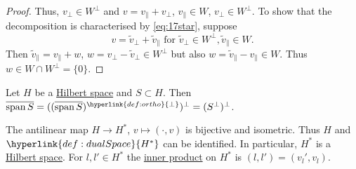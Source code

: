 \documentclass{article}
\DeclareMathOperator{\spn}{span}
\begin{document}
\begin{proof}
    Thus, $v_\perp \in W^\perp$ and $v = v_\parallel + v_\perp$, $v_\parallel \in W$, $v_\perp \in W^\perp$.
    To show that the decomposition is characterised by \eqref{eq:17star}, suppose
    \begin{equation*}
        v = \tilde{v}_\perp + \tilde{v}_\parallel \text{ for } \tilde{v}_\perp \in W^\perp, \tilde{v}_\parallel \in W.
    \end{equation*}
    Then $\tilde{v}_\parallel = v_\parallel + w$, $w = v_\perp - \tilde{v}_\perp \in W^\perp$ but also $w = \tilde{v}_\parallel - v_\parallel \in W$. Thus $w \in W \cap W^\perp = \{0\}$.
\end{proof}

\begin{cor}
    Let $H$ be a \hyperlink{def:euclidean}{Hilbert space} and $S \subset H$.
    Then $\overline{\spn S} = ((\overline{\spn S})^{\hyperlink{def:ortho}{\perp}})^\perp  = (S^\perp)^\perp$.
\end{cor}


\begin{cor}
    The antilinear map $H \to H^*$, $v \mapsto (\cdot, v)$ is bijective and isometric.
    Thus $H$ and $\hyperlink{def:dualSpace}{H^*}$ can be identified.
    In particular, $H^*$ is a \hyperlink{def:euclidean}{Hilbert space}.
    For $l, l' \in H^*$ the \hyperlink{def:ip}{inner product} on $H^*$ is $(l, l') = (v_l', v_l)$.
\end{cor}
\end{document}
